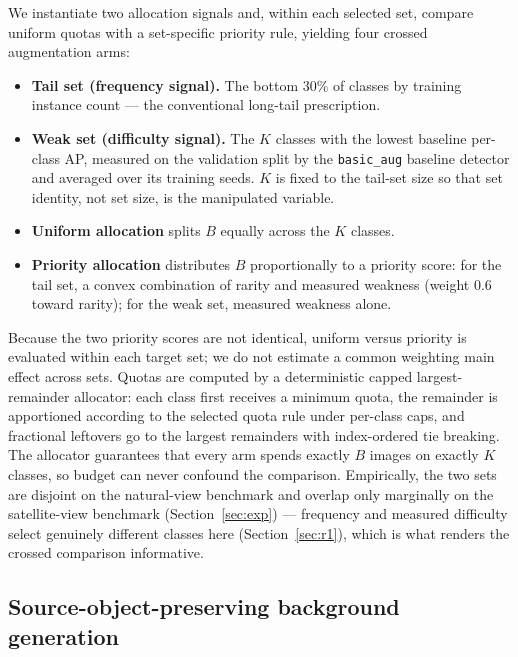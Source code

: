 \documentclass[preprint,12pt,authoryear]{elsarticle}
\begin{document}
We instantiate two allocation signals and, within each selected set,
compare uniform quotas with a set-specific priority rule, yielding four
crossed augmentation arms:
\begin{itemize}
\item \textbf{Tail set (frequency signal).} The bottom 30\% of classes
  by training instance count --- the conventional long-tail
  prescription.
\item \textbf{Weak set (difficulty signal).} The $K$ classes with the
  lowest baseline per-class AP, measured on the validation split by the
  \texttt{basic\_aug} baseline detector and averaged over its training
  seeds. $K$ is fixed to the tail-set size so that set identity, not set
  size, is the manipulated variable.
\item \textbf{Uniform allocation} splits $B$ equally across the $K$
  classes.
\item \textbf{Priority allocation} distributes $B$ proportionally to a
  priority score: for the tail set, a convex combination of rarity and
  measured weakness (weight 0.6 toward rarity); for the weak set,
  measured weakness alone.
\end{itemize}
Because the two priority scores are not identical, uniform versus
priority is evaluated within each target set; we do not estimate a common
weighting main effect across sets.
Quotas are computed by a deterministic capped largest-remainder
allocator: each class first receives a minimum quota, the remainder is
apportioned according to the selected quota rule under per-class caps, and
fractional leftovers go to the largest remainders with index-ordered tie
breaking. The allocator guarantees that every arm spends exactly $B$
images on exactly $K$ classes, so budget can never confound the
comparison. Empirically, the two sets are disjoint on the natural-view
benchmark and overlap only marginally on the satellite-view benchmark
(Section~\ref{sec:exp}) --- frequency and measured difficulty select
genuinely different classes here (Section~\ref{sec:r1}), which is what
renders the crossed comparison informative.

\subsection{Source-object-preserving background generation}\label{sec:generation}
\end{document}
